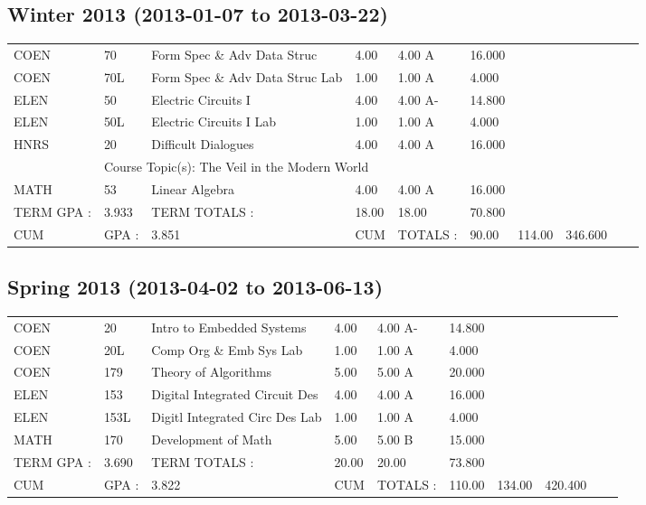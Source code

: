 \documentclass{scrartcl}\usepackage[T1]{fontenc}
\begin{document}
\subsection{Winter 2013	(2013-01-07 to 2013-03-22)}
\begin{tabular}{ l  l  l  l  l  l  l  l  l  l }
COEN&70&Form Spec \& Adv Data Struc&4.00&4.00 A&16.000& & & & \\
COEN&70L&Form Spec \& Adv Data Struc Lab&1.00&1.00 A&4.000& & & & \\
ELEN&50&Electric Circuits I&4.00&4.00 A-&14.800& & & & \\
ELEN&50L&Electric Circuits I Lab&1.00&1.00 A&4.000& & & & \\
HNRS&20&Difficult Dialogues&4.00&4.00 A&16.000& & & & \\
\multicolumn{1}{l}{ }
&
\multicolumn{9}{l}{Course Topic(s): The Veil in the Modern World}
\\
MATH&53&Linear Algebra&4.00&4.00 A&16.000& & & & \\
\hline
TERM GPA :&3.933&TERM TOTALS :&18.00&18.00&70.800& & & & \\
CUM&GPA :&3.851&CUM&TOTALS :&90.00&114.00&346.600& & \\\end{tabular}
\subsection{Spring 2013	(2013-04-02 to 2013-06-13)}
\begin{tabular}{ l  l  l  l  l  l  l  l  l  l }
COEN&20&Intro to Embedded Systems&4.00&4.00 A-&14.800& & & & \\
COEN&20L&Comp Org \& Emb Sys Lab&1.00&1.00 A&4.000& & & & \\
COEN&179&Theory of Algorithms&5.00&5.00 A&20.000& & & & \\
ELEN&153&Digital Integrated Circuit Des&4.00&4.00 A&16.000& & & & \\
ELEN&153L&Digitl Integrated Circ Des Lab&1.00&1.00 A&4.000& & & & \\
MATH&170&Development of Math&5.00&5.00 B&15.000& & & & \\
\hline
TERM GPA :&3.690&TERM TOTALS :&20.00&20.00&73.800& & & & \\
CUM&GPA :&3.822&CUM&TOTALS :&110.00&134.00&420.400& & \\\end{tabular}
\end{document}

